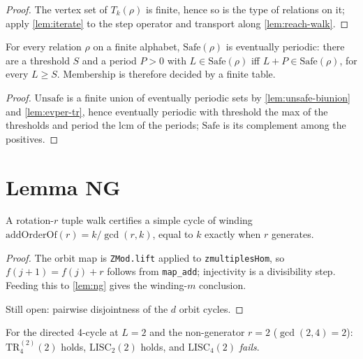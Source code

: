 \begin{proof}
\leanok
{}
The vertex set of $T_k(\rho)$ is finite, hence so is the type of relations on
it; apply \ref{lem:iterate} to the step operator and transport along
\ref{lem:reach-walk}.
\end{proof}

\begin{theorem}[Theorem B]
\label{thm:B}
\leanok
{}
For every relation $\rho$ on a finite alphabet, $\mathrm{Safe}(\rho)$ is
eventually periodic: there are a threshold $S$ and a period $P > 0$ with
$L \in \mathrm{Safe}(\rho)$ iff $L+P \in \mathrm{Safe}(\rho)$, for every
$L \geq S$. Membership is therefore decided by a finite table.
\end{theorem}

\begin{proof}
\leanok
{}
$\mathrm{Unsafe}$ is a finite union of eventually periodic sets by
\ref{lem:unsafe-biunion} and \ref{lem:evper-tr}, hence eventually periodic with
threshold the max of the thresholds and period the lcm of the periods;
$\mathrm{Safe}$ is its complement among the positives.
\end{proof}

\section{Lemma NG}

\begin{lemma}
\label{lem:ng-orbit}
\leanok
{}
A rotation-$r$ tuple walk certifies a simple cycle of winding
$\mathrm{addOrderOf}(r) = k/\gcd(r,k)$, equal to $k$ exactly when $r$
generates.
\end{lemma}

\begin{proof}
\leanok
{}
The orbit map is \texttt{ZMod.lift} applied to \texttt{zmultiplesHom}, so
$f(j+1) = f(j) + r$ follows from \texttt{map\_add}; injectivity is a
divisibility step. Feeding this to \ref{lem:ng} gives the winding-$m$
conclusion.

Still open: pairwise disjointness of the $d$ orbit cycles.
\end{proof}

\begin{theorem}
\label{thm:ng-refute}
\leanok
{}
For the directed 4-cycle at $L = 2$ and the non-generator $r = 2$
($\gcd(2,4) = 2$): $\mathrm{TR}_4^{(2)}(2)$ holds, $\mathrm{LISC}_2(2)$ holds,
and $\mathrm{LISC}_4(2)$ \emph{fails}.
\end{theorem}

